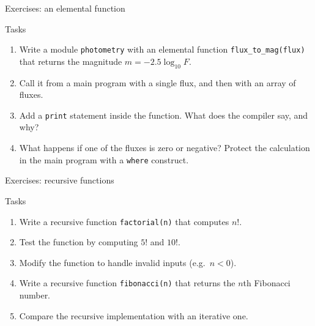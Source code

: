 \begin{frame}{Exercises: an elemental function}
  \begin{block}{Tasks}
    \begin{enumerate}
      \item Write a module \texttt{photometry} with an elemental function \texttt{flux\_to\_mag(flux)} that returns the magnitude $m = -2.5 \log_{10} F$.
      \item Call it from a main program with a single flux, and then with an array of fluxes.
      \item Add a \texttt{print} statement inside the function. What does the compiler say, and why?
      \item What happens if one of the fluxes is zero or negative? Protect the calculation in the main program with a \texttt{where} construct.
    \end{enumerate}
  \end{block}
\end{frame}


\begin{frame}{Exercises: recursive functions}
  \begin{block}{Tasks}
    \begin{enumerate}
      \item Write a recursive function \texttt{factorial(n)} that computes $n!$.
      \item Test the function by computing $5!$ and $10!$.
      \item Modify the function to handle invalid inputs (e.g.\ $n < 0$).
      \item Write a recursive function \texttt{fibonacci(n)} that returns the $n$th Fibonacci number.
      \item Compare the recursive implementation with an iterative one.
    \end{enumerate}
  \end{block}
\end{frame}



